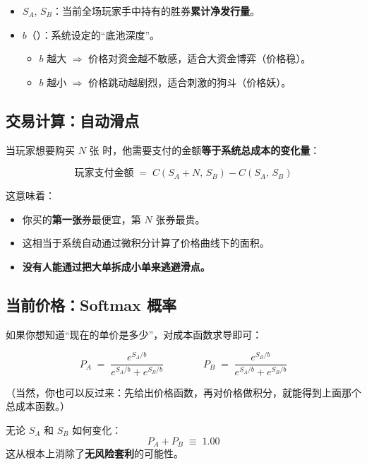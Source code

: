\documentclass[11pt,a4paper,twoside]{article}
\begin{document}
\begin{itemize}
  \item $S_A,\,S_B$：当前全场玩家手中持有的胜券\textbf{累计净发行量}。
  \item $b$（）：系统设定的“底池深度”。
  \begin{itemize}
    \item $b$ 越大 $\Rightarrow$ 价格对资金越不敏感，适合大资金博弈（价格稳）。
    \item $b$ 越小 $\Rightarrow$ 价格跳动越剧烈，适合刺激的狗斗（价格妖）。
  \end{itemize}
\end{itemize}

\subsection{交易计算：自动滑点}

当玩家想要购买 $N$ 张 \Acard 时，他需要支付的金额\textbf{等于系统总成本的变化量}：

\begin{mathbox}
\[
  \text{玩家支付金额} \;=\; C(S_A + N,\,S_B) - C(S_A,\,S_B)
\]
\end{mathbox}

这意味着：

\begin{itemize}
  \item 你买的\textbf{第一张}券最便宜，第 $N$ 张券最贵。
  \item 这相当于系统自动通过微积分计算了价格曲线下的面积。
  \item \textbf{没有人能通过把大单拆成小单来逃避滑点。}
\end{itemize}

\subsection{当前价格：Softmax 概率}

如果你想知道“现在的单价是多少”，对成本函数求导即可：

\begin{mathbox}
\[
  P_A \;=\; \frac{e^{S_A/b}}{e^{S_A/b} + e^{S_B/b}}
  \qquad\qquad
  P_B \;=\; \frac{e^{S_B/b}}{e^{S_A/b} + e^{S_B/b}}
\]
\end{mathbox}

（当然，你也可以反过来：先给出价格函数，再对价格做积分，就能得到上面那个总成本函数。）

\begin{notebox}
无论 $S_A$ 和 $S_B$ 如何变化：
\[
  P_A + P_B \;\equiv\; 1.00
\]
这从根本上消除了\textbf{无风险套利}的可能性。
\end{notebox}
\end{document}

